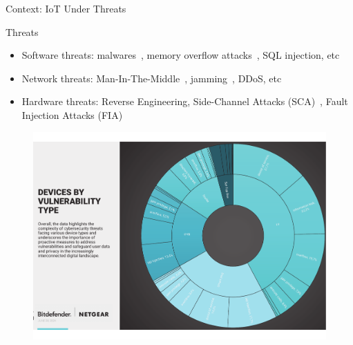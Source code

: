 \begin{frame}{Context: IoT Under Threats}
    \begin{block}{Threats}
        \begin{itemize}
            [square]
            \justifying
            \item Software threats: malwares~\cite{FIMI-23-access}, memory overflow attacks~\cite{CWCBW-00-discex}, SQL injection, etc
            \item Network threats: Man-In-The-Middle~\cite{CDL-16-commsurtuto}, jamming~\cite{PZ-22-commsurtuto}, DDoS, etc
            \item Hardware threats: Reverse Engineering, Side-Channel Attacks (SCA)~\cite{DM-21-appiot}, Fault Injection Attacks (FIA)~\cite{BCNTW-06-procieee}
        \end{itemize}
    \end{block}

    \begin{center}
        \begin{minipage}[r]{.4\textwidth}
            \begin{figure}
                \centering
                \includegraphics[height=.62\textheight, trim={10.85cm 0cm 0cm 0cm}, clip]{src/1_introduction/img/threats_iot.pdf}
            \end{figure}
        \end{minipage}\hspace{.5cm}%
        \begin{minipage}[c]{0.3\textwidth}
        \end{minipage}
    \end{center}
\end{frame}

